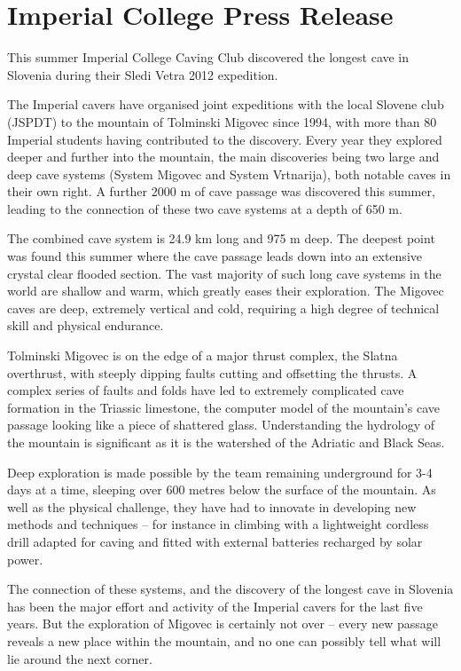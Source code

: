 \section{Imperial College Press Release}

This summer Imperial College Caving Club discovered the longest cave in Slovenia during their Sledi Vetra 2012 expedition.

The Imperial cavers have organised joint expeditions with the local Slovene club (JSPDT) to the mountain of Tolminski Migovec since 1994, with more than 80 Imperial students having contributed to the discovery. Every year they explored deeper and further into the mountain, the main discoveries being two large and deep cave systems (System Migovec and System Vrtnarija), both notable caves in their own right. A further 2000 m of cave passage was discovered this summer, leading to the connection of these two cave systems at a depth of 650 m.

The combined cave system is 24.9 km long and 975 m deep. The deepest point was found this summer where the cave passage leads down into an extensive crystal clear flooded section. The vast majority of such long cave systems in the world are shallow and warm, which greatly eases their exploration. The Migovec caves are deep, extremely vertical and cold, requiring a high degree of technical skill and physical endurance.

Tolminski Migovec is on the edge of a major thrust complex, the Slatna overthrust, with steeply dipping faults cutting and offsetting the thrusts. A complex series of faults and folds have led to extremely complicated cave formation in the Triassic limestone, the computer model of the mountain’s cave passage looking like a piece of shattered glass. Understanding the hydrology of the mountain is significant as it is the watershed of the Adriatic and Black Seas.

Deep exploration is made possible by the team remaining underground for 3-4 days at a time, sleeping over 600 metres below the surface of the mountain. As well as the physical challenge, they have had to innovate in developing new methods and techniques – for instance in climbing with a lightweight cordless drill adapted for caving and fitted with external batteries recharged by solar power.

The connection of these systems, and the discovery of the longest cave in Slovenia has been the major effort and activity of the Imperial cavers for the last five years. But the exploration of Migovec is certainly not over – every new passage reveals a new place within the mountain, and no one can possibly tell what will lie around the next corner.